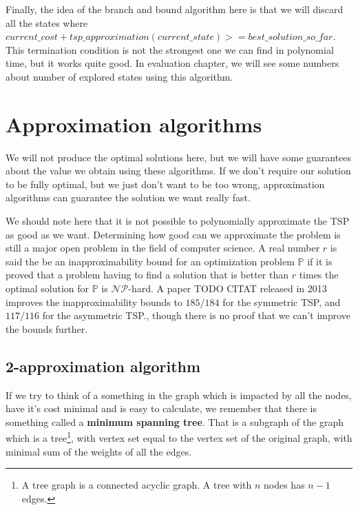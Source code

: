 \documentclass[12pt,twoside,notitlepage]{report}
\begin{document}
\smallskip

Finally, the idea of the branch and bound algorithm here is that we will discard all the states where $current\_cost + tsp\_approximation(current\_state) >= best\_solution\_so\_far$. This termination condition is not the strongest one we can find in polynomial time, but it works quite good. In evaluation chapter, we will see some numbers about number of explored states using this algorithm.

\section{Approximation algorithms}

We will not produce the optimal solutions here, but we will have some guarantees about the value we obtain using these algorithms. If we don't require our solution to be fully optimal, but we just don't want to be too wrong, approximation algorithms can guarantee the solution we want really fast.

\smallskip

We should note here that it is not possible to polynomially approximate the TSP as good as we want. Determining how good can we approximate the problem is still a major open problem in the field of computer science. A real number $r$ is said the be an inapproximability bound for an optimization problem $\mathbb{P}$ if it is proved that a problem having to find a solution that is better than $r$ times the optimal solution for $\mathbb{P}$ is $\mathcal{NP}$-hard. A paper TODO CITAT released in 2013 improves the inapproximability bounds to $185/184$ for the symmetric TSP, and $117/116$ for the asymmetric TSP., though there is no proof that we can't improve the bounds further.

\subsection{2-approximation algorithm}

If we try to think of a something in the graph which is impacted by all the nodes, have it's cost minimal and is easy to calculate, we remember that there is something called a {\bf minimum spanning tree}. That is a subgraph of the graph which is a tree\footnote{A tree graph is a connected acyclic graph. A tree with $n$ nodes has $n - 1$ edges.}, with vertex set equal to the vertex set of the original graph, with minimal sum of the weights of all the edges.

\smallskip
\end{document}
